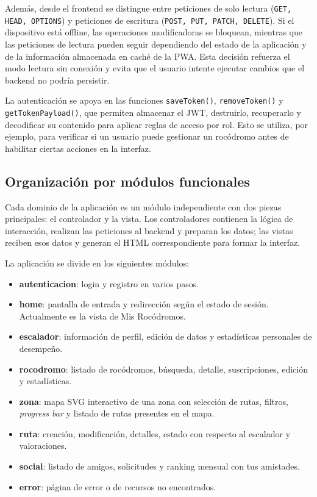 Además, desde el frontend se distingue entre peticiones de solo lectura (\texttt{GET, HEAD, OPTIONS}) y peticiones de escritura (\texttt{POST, PUT, PATCH, DELETE}). Si el dispositivo está offline, las operaciones modificadoras se bloquean, mientras que las peticiones de lectura pueden seguir dependiendo del estado de la aplicación y de la información almacenada en caché de la PWA. Esta decisión refuerza el modo lectura sin conexión y evita que el usuario intente ejecutar cambios que el backend no podría persistir.

La autenticación se apoya en las funciones \texttt{saveToken()}, \texttt{removeToken()} y \texttt{getTokenPayload()}, que permiten almacenar el JWT, destruirlo, recuperarlo y decodificar su contenido para aplicar reglas de acceso por rol. Esto se utiliza, por ejemplo, para verificar si un usuario puede gestionar un rocódromo antes de habilitar ciertas acciones en la interfaz.

\subsection{Organización por módulos funcionales}

Cada dominio de la aplicación es un módulo independiente con dos piezas principales: el controlador y la vista. Los controladores contienen la lógica de interacción, realizan las peticiones al backend y preparan los datos; las vistas reciben esos datos y generan el HTML correspondiente para formar la interfaz.

La aplicación se divide en los siguientes módulos:

\begin{itemize}
  \item \textbf{autenticacion}: login y registro en varios pasos.
  \item \textbf{home}: pantalla de entrada y redirección según el estado de sesión. Actualmente es la vista de Mis Rocódromos.
  \item \textbf{escalador}: información de perfil, edición de datos y estadísticas personales de desempeño.
  \item \textbf{rocodromo}: listado de rocódromos, búsqueda, detalle, suscripciones, edición y estadísticas.
  \item \textbf{zona}: mapa SVG interactivo de una zona con selección de rutas, filtros, \textit{progress bar} y listado de rutas presentes en el mapa.
  \item \textbf{ruta}: creación, modificación, detalles, estado con respecto al escalador y valoraciones.
  \item \textbf{social}: listado de amigos, solicitudes y ranking mensual con tus amistades.
  \item \textbf{error}: página de error o de recursos no encontrados.
\end{itemize}

